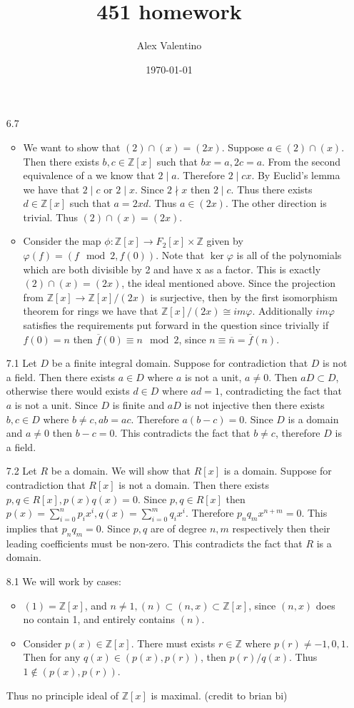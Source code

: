 \documentclass[12pt, letterpaper]{article}
\date{\today}
\author{Alex Valentino}
\title{451 homework}
\newcommand{\Z}{\mathbb{Z}}
\begin{document}
\begin{enumerate}
	\item[6.7]
	\begin{itemize}
		\item We want to show that $(2) \cap (x) = (2x)$.  Suppose $a \in (2) \cap (x)$.  Then there exists $b,c \in \Z[x]$ such that $bx = a, 2c = a$.  From the second equivalence of a we know that $2 \mid a$.  Therefore $2 \mid cx$.  By 
		Euclid's lemma we have that $2 \mid c$ or $2 \mid x$.  Since $2 \nmid x$
		then $2 \mid c$.  Thus there exists $d \in \Z[x]$ such that $a = 2xd$.  
		Thus $a \in (2x)$.  The other direction is trivial.  Thus $(2) \cap (x) = (2x)$.  
		\item Consider the map $\phi : \Z[x] \to F_2 [x] \times \Z$ given by 
		$\varphi(f) = (f \mod{2}, f(0))$.  Note that $\ker \varphi$ is all of the 
		polynomials which are both divisible by 2 and have x as a factor.  This 
		is exactly $(2) \cap (x) = (2x)$, the ideal mentioned above.  Since the 
		projection from $\Z[x] \to \Z[x]/(2x)$ is surjective, then by the first 
		isomorphism theorem for rings we have that $\Z[x]/(2x) \cong im \varphi$.
		Additionally $im \varphi$ satisfies the requirements put forward in the 
		question since trivially if $f(0) = n$ then $\overline{f}(0) \equiv n \mod{2}$, since $n \equiv \overline{n} = \overline{f}(n)$.  
	\end{itemize}
	\item[7.1] Let $D$ be a finite integral domain.  Suppose for contradiction 
	that $D$ is not a field.  Then there exists $a \in D$ where $a$ is not a unit,
	$a \neq 0$.
	Then $aD \subset D$, otherwise there would exists $d \in D$ where $ad = 1$, 
	contradicting the fact that $a$ is not a unit.  Since $D$ is finite and $aD$
	is not injective then there exists $b,c \in D$ where $b \neq c, ab = ac$.
	Therefore $a(b-c) = 0$.  Since $D$ is a domain and  $a \neq 0$ then $b-c =0$.
	This contradicts the fact that $b \neq c$, therefore $D$ is a field.
	\item[7.2] Let $R$ be a domain.  We will show that $R[x]$ is a domain.  
	Suppose for contradiction that $R[x]$ is not a domain.  Then there exists
	$p,q \in R[x], p(x)q(x) = 0$.  Since $p,q\in R[x]$ then $p(x) = \sum_{i=0}^n p_i x^i, q(x) = \sum_{i=0}^m q_i x^i$.  Therefore $p_n q_m x^{n+m} = 0$.  This implies that $p_n q_m = 0$.  Since $p,q$ are of degree $n,m$ respectively then 
	their leading coefficients must be non-zero.  This contradicts the fact that 
	$R$ is a domain.  
	\item[8.1] We will work by cases:
	\begin{itemize}
		\item $(1) = \Z[x]$, and $n \neq 1, (n) \subset (n,x) \subset \Z[x]$, 
		since $(n,x)$ does no contain 1, and entirely contains $(n)$.
		\item Consider $p(x) \in \Z[x]$.  There must exists $r \in \Z$ where 
		$p(r) \neq -1,0,1$.  Then for any $q(x) \in (p(x),p(r))$, then $p(r)/q(x)$.
		Thus $1 \not \in (p(x),p(r))$.
	\end{itemize}
	Thus no principle ideal of $\Z[x]$ is maximal.  (credit to brian bi)
	

\end{enumerate}
\end{document}
